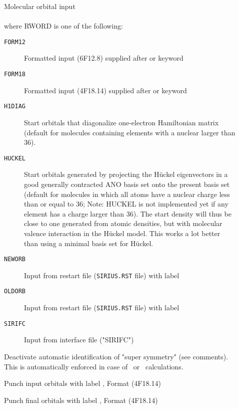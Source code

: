 \begin{description}
\item[]
   Molecular orbital input\\
    \\
   where RWORD is one of the following:
   \begin{description}
   \item[{\tt FORM12\ }] Formatted input (6F12.8)  supplied after
         or  keyword
   \item[{\tt FORM18\ }] Formatted input (4F18.14) supplied after
         or  keyword
   \item[{\tt H1DIAG\ }] Start orbitals that diagonalize
        one-electron Hamiltonian matrix (default
        for molecules containing elements with a nuclear larger than 36).
   \item[{\tt HUCKEL\ }] Start orbitals generated by projecting the
        H{\"u}ckel eigenvectors in a good generally contracted ANO basis set
        onto the present basis set
        (default for molecules in which all atoms have a nuclear charge less than
        or equal to 36; Note: HUCKEL is not implemented yet if any element has a
        charge larger than 36).
        The start density will thus be close to one generated from atomic densities,
        but with molecular valence interaction in the H{\"u}ckel model.
        This works a lot better than using a minimal basis set for H{\"u}ckel.
   \item[{\tt NEWORB\ }] Input from {\sir} restart file
                            (\verb|SIRIUS.RST| file) with label 
   \item[{\tt OLDORB\ }] Input from {\sir} restart file
                            (\verb|SIRIUS.RST| file) with label 
   \item[{\tt SIRIFC\ }] Input from {\sir} interface file ("SIRIFC")
   \end{description}

\item[]
  Deactivate automatic identification of "super
  symmetry" (see
  comments). This is automatically enforced in case of \aba\ or
  \resp\ calculations.

\item[]
  Punch input orbitals with label , Format (4F18.14)

\item[]
  Punch final orbitals with label , Format (4F18.14)


\end{description}
